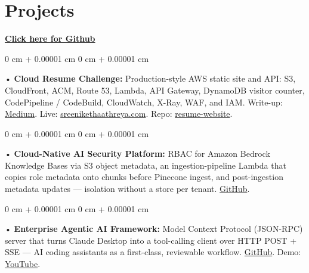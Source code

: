 \documentclass[10pt, letterpaper]{article}
\newenvironment{onecolentry}{
    \begin{adjustwidth}{
        0 cm + 0.00001 cm
    }{
        0 cm + 0.00001 cm
    }
}{
    \end{adjustwidth}
} %
\begin{document}
\section{Projects}
    \vspace{2 pt}
\textbf{\href{https://github.com/daedalus-s}{Click here for Github}}
\begin{onecolentry}
     • \textbf{Cloud Resume Challenge:} Production-style AWS static site and API: S3, CloudFront, ACM, Route 53, Lambda, API Gateway, DynamoDB visitor counter, CodePipeline / CodeBuild, CloudWatch, X-Ray, WAF, and IAM. Write-up: \href{https://medium.com/@sreenikethaathreya/cloud-resume-challenge-c4f17c3d53ff}{Medium}. Live: \href{https://sreenikethaathreya.com}{sreenikethaathreya.com}. Repo: \href{https://github.com/daedalus-s/resume-website}{resume-website}.
\end{onecolentry}
\begin{onecolentry}
     • \textbf{Cloud-Native AI Security Platform:} RBAC for Amazon Bedrock Knowledge Bases via S3 object metadata, an ingestion-pipeline Lambda that copies role metadata onto chunks before Pinecone ingest, and post-ingestion metadata updates --- isolation without a store per tenant. \href{https://github.com/daedalus-s/bedrock-acl-metadata}{GitHub}.
\end{onecolentry}
\begin{onecolentry}
     • \textbf{Enterprise Agentic AI Framework:} Model Context Protocol (JSON-RPC) server that turns Claude Desktop into a tool-calling client over HTTP POST + SSE --- AI coding assistants as a first-class, reviewable workflow. \href{https://github.com/daedalus-s/dota2-mcp-server}{GitHub}. Demo: \href{https://www.youtube.com/watch?v=op2gTYyFb5U}{YouTube}.
\end{onecolentry}
\vspace{2 pt}
        \vspace{2 pt }
\end{document}
